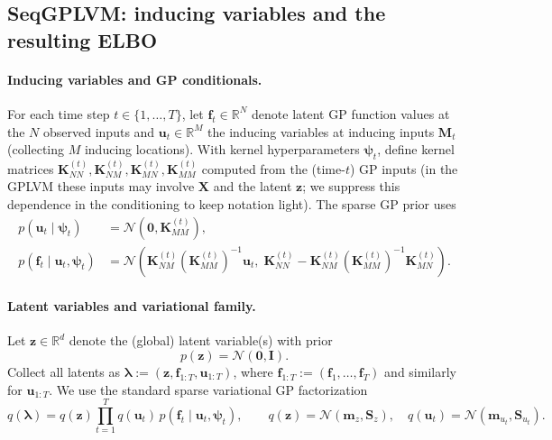 \subsection{SeqGPLVM: inducing variables and the resulting ELBO}

\paragraph{Inducing variables and GP conditionals.}
For each time step \(t\in\{1,\dots,T\}\), let \(\mathbf{f}_t\in\mathbb{R}^{N}\) denote latent GP function values at the \(N\) observed inputs and \(\mathbf{u}_t\in\mathbb{R}^{M}\) the inducing variables at inducing inputs \(\mathbf{M}_t\) (collecting \(M\) inducing locations). With kernel hyperparameters \(\boldsymbol{\psi}_t\), define kernel matrices
\(
\mathbf{K}^{(t)}_{NN}, \mathbf{K}^{(t)}_{NM}, \mathbf{K}^{(t)}_{MN}, \mathbf{K}^{(t)}_{MM}
\)
computed from the (time-\(t\)) GP inputs (in the GPLVM these inputs may involve \(\mathbf{X}\) and the latent \(\mathbf{z}\); we suppress this dependence in the conditioning to keep notation light).
The sparse GP prior uses
\begin{align}
p(\mathbf{u}_t\mid \boldsymbol{\psi}_t) &= \mathcal{N}\!\left(\mathbf{0},\mathbf{K}^{(t)}_{MM}\right),
\\
p(\mathbf{f}_t\mid \mathbf{u}_t,\boldsymbol{\psi}_t)
&=\mathcal{N}\!\left(
\mathbf{K}^{(t)}_{NM}(\mathbf{K}^{(t)}_{MM})^{-1}\mathbf{u}_t,\;
\mathbf{K}^{(t)}_{NN}-\mathbf{K}^{(t)}_{NM}(\mathbf{K}^{(t)}_{MM})^{-1}\mathbf{K}^{(t)}_{MN}
\right).
\label{eq:gp-conditional}
\end{align}

\paragraph{Latent variables and variational family.}
Let \(\mathbf{z}\in\mathbb{R}^{d}\) denote the (global) latent variable(s) with prior
\begin{equation}
p(\mathbf{z})=\mathcal{N}(\mathbf{0},\mathbf{I}).
\label{eq:z-prior}
\end{equation}
Collect all latents as
\(
\boldsymbol{\lambda} := (\mathbf{z},\mathbf{f}_{1:T},\mathbf{u}_{1:T})
\),
where \(\mathbf{f}_{1:T}:=(\mathbf{f}_1,\dots,\mathbf{f}_T)\) and similarly for \(\mathbf{u}_{1:T}\).
We use the standard sparse variational GP factorization
\begin{equation}
q(\boldsymbol{\lambda})
=
q(\mathbf{z})\prod_{t=1}^{T} q(\mathbf{u}_t)\,p(\mathbf{f}_t\mid \mathbf{u}_t,\boldsymbol{\psi}_t),
\qquad
q(\mathbf{z})=\mathcal{N}(\mathbf{m}_z,\mathbf{S}_z),
\quad
q(\mathbf{u}_t)=\mathcal{N}(\mathbf{m}_{u_t},\mathbf{S}_{u_t}).
\label{eq:q-factorization}
\end{equation}

